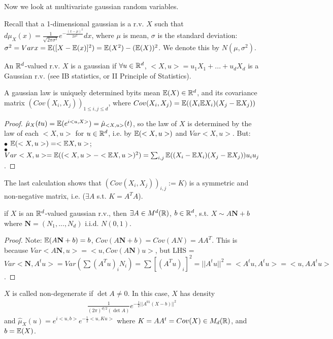 \documentclass[a4paper]{article}
\begin{document}
Now we look at multivariate gaussian random variables.

Recall that a 1-dimensional gaussian is a r.v. $X$ such that $d\mu_X(x) = \frac{1}{\sqrt{2\pi \sigma^2}} e^{-\frac{(x-\mu)^2}{2\sigma^2}} dx$, where $\mu$ is mean, $\sigma$ is the standard deviation: $\sigma^2 = Var x = \mathbb{E}([X-\mathbb{E}(x)]^2) = \mathbb{E}(X^2) - (\mathbb{E}(X))^2$. We denote this by $N(\mu,\sigma^2)$.

\begin{defi}
An $\mathbb{R}^d$-valued r.v. $X$ is a gaussian if $\forall u \in \mathbb{R}^d$, $<X,u> = u_1X_1+...+u_dX_d$ is a Gaussian r.v. (see IB statistics, or II Principle of Statistics).\\
\end{defi}

\begin{prop}
A gaussian law is uniquely determined byits mean $\mathbb{E}(X) \in \mathbb{R}^d$, and its covariance matrix $(Cov(X_i,X_j))_{1 \leq i,j \leq d}$, where $Cov(X_i,X_j) =\mathbb{E}((X_i\mathbb{E} X_i)(X_j - \mathbb{E} X_j))$
\begin{proof}
$\hat{\mu}_X (tu) = \mathbb{E} (e^{i<u,X>}) = \hat{\mu}_{<X,u>}(t)$, so the law of $X$ is determined by the law of each $<X,u>$ for $u \in \mathbb{R}^d$, i.e. by $\mathbb{E}(<X,u>)$ and $Var<X,u>$. But:\\
$\bullet$ $\mathbb{E}(<X,u>) = <\mathbb{E} X,u>$;\\
$\bullet$ $Var<X,u> = \mathbb{E}((<X,u> - <\mathbb{E} X,u>)^2) = \sum_{i,j} \mathbb{E}((X_i-\mathbb{E} X_i) (X_j - \mathbb{E} X_j)) u_i u_j$.
\end{proof}
\end{prop}

\begin{rem}
The last calculation shows that $(Cov (X_i,X_j))_{i,j} := K)$ is a symmetric and non-negative matrix, i.e. ($\exists A$ s.t. $K =A^T A$).
\end{rem}

\begin{prop}
if $X$ is an $\mathbb{R}^d$-valued gaussian r.v., then $\exists A \in M^d(\mathbb{R})$, $b \in \mathbb{R}^d$, s.t. $X \sim A \mathbf{N}+b$ where $\mathbf{N} = (N_1,...,N_d)$ i.i.d. $N(0,1)$.
\begin{proof}
Note: $\mathbb{E}(A\mathbf{N}+b) = b$, $Cov (A\mathbf{N}+b) = Cov(A N) = A A^T$. This is because $Var<A\mathbf{N},u> = <u,Cov(A \mathbf{N})u>$, but LHS = $Var<\mathbf{N},A^t u> = Var(\sum(A^T u)_iN_i) = \sum [(A^T u)_i]^2 = ||A^t u||^2 = <A^t u, A^t u> = <u,AA^tu>$.
\end{proof}
\end{prop}

\begin{defi}
$X$ is called non-degenerate if $\det A \neq 0$. In this case, $X$ has density
\begin{equation*}
\begin{aligned}
\frac{1}{(2\pi)^{d/2} (\det A)} e^{-\frac{1}{2} ||A^{01}(X-b)||^2}
\end{aligned}
\end{equation*}
and $\hat{\mu}_X(u) = e^{i<u,b>} e^{-\frac{1}{2}<u,Ku>}$ where $K = A A^t = Cov(X) \in M_d (\mathbb{R})$, and $b = \mathbb{E}(X)$.
\end{defi}
\end{document}
